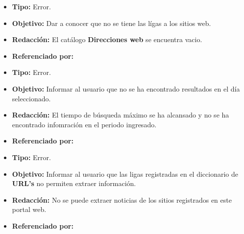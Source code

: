  
    \begin{itemize}
      \item \textbf{Tipo:} Error. 
      \item \textbf{Objetivo:}  Dar a conocer que no se tiene las lígas a los sitios web.
      \item \textbf{Redacción:} El catálogo \textbf{Direcciones web} se encuentra vacio.
      \item \textbf{Referenciado por:} \\
    \end{itemize}

  \begin{itemize}
    \item \textbf{Tipo:} Error. 
    \item \textbf{Objetivo:}  Informar al usuario que no se ha encontrado resultados en el día seleccionado.
    \item \textbf{Redacción:}  El tiempo de búsqueda máximo se ha alcansado y no se ha encontrado infomración en el periodo ingresado.
    \item \textbf{Referenciado por:} \\
  \end{itemize}

  \begin{itemize}
    \item \textbf{Tipo:} Error. 
    \item \textbf{Objetivo:}  Informar al usuario que las ligas registradas en el diccionario de \textbf{URL's} no permiten extraer información.
    \item \textbf{Redacción:} No se puede extraer noticias de los sitios registrados en este portal web.
    \item \textbf{Referenciado por:} \\
  \end{itemize}

